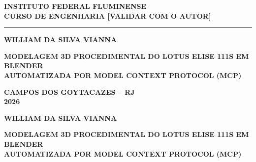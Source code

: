 \thispagestyle{empty}

\begin{center}
  {\bfseries\large INSTITUTO FEDERAL FLUMINENSE}\\[2pt]
  {\bfseries CURSO DE ENGENHARIA [VALIDAR COM O AUTOR]}\\[1pt]
  \rule{\textwidth}{0.4pt}
\end{center}

\vspace{2.6cm}

\begin{center}
  {\bfseries\Large WILLIAM DA SILVA VIANNA}
\end{center}

\vspace{3.2cm}

\begin{center}
  {\bfseries\Large MODELAGEM 3D PROCEDIMENTAL DO LOTUS ELISE 111S EM BLENDER\\[6pt]
   AUTOMATIZADA POR MODEL CONTEXT PROTOCOL (MCP)}
\end{center}

\vfill

\begin{center}
  {\bfseries CAMPOS DOS GOYTACAZES -- RJ}\\[2pt]
  {\bfseries 2026}
\end{center}

\clearpage

\thispagestyle{empty}
\begin{center}
  {\bfseries\large WILLIAM DA SILVA VIANNA}
\end{center}

\vspace{3.0cm}

\begin{center}
  {\bfseries\Large MODELAGEM 3D PROCEDIMENTAL DO LOTUS ELISE 111S EM BLENDER\\[6pt]
   AUTOMATIZADA POR MODEL CONTEXT PROTOCOL (MCP)}
\end{center}

\vspace{1.5cm}

